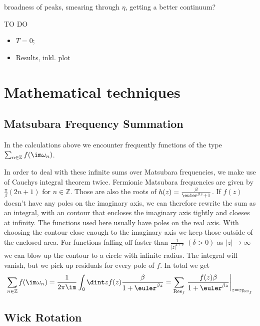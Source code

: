 \documentclass[a4paper,10pt]{report}
\begin{document}
broadness of peaks, smearing through $\eta$, getting a better continuum?
\newpage

TO DO
\begin{itemize}
 \item $T=0$;
 \item Results, inkl. plot
\end{itemize}









\appendix

\chapter{Mathematical techniques}

\section{Matsubara Frequency Summation} \label{MFS}

In the calculations above we encounter frequently functions of the type 
$ \sum_{n \in \mathbb{Z}} f(\im \omega_n)$.

In order to deal with these infinite sums over Matsubara frequencies, we make use of Cauchys integral theorem twice.
Fermionic Matsubara frequencies are given by $\frac{\pi}{\beta}(2n+1)$ for $n \in \mathbb{Z}$.
Those are also the roots of $h(z) = \frac{\beta}{\euler^{\beta z}+1}$.
If $f(z)$ doesn't have any poles on the imaginary axis, we can therefore rewrite the sum as an integral, 
with an contour that encloses the imaginary axis tightly and cloeses at infinity.
The functions used here usually have poles on the real axis. 
With choosing the contour close enough to the imaginary axis we keep those outside of the enclosed area.
For functions falling off faster than $\frac{1}{|z|^{1+\delta}}$ $(\delta>0)$ as $|z|\rightarrow \infty$ we can blow up the contour to a
circle with infinite radius. The integral will vanish, but we pick up residuals for every pole of $f$.
In total we get
\begin{equation}
 \sum_{n\in\mathbb{Z}} f(\im \omega_n) = \frac{1}{2\pi \im} \int_0 \dint z f(z)\frac{\beta}{1+\euler^{\beta z }} 
 = \sum_{\mathrm{Res}_f} \left. \frac{f(z)\beta}{1+\euler^{\beta z }}\right|_{z=z_{\mathrm{Res}_f}}
\end{equation}

\section{Wick Rotation}






\end{document}
